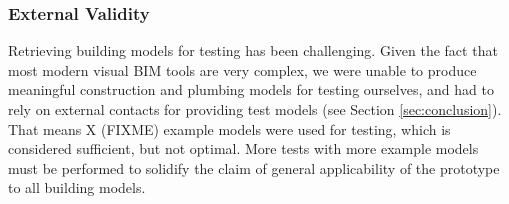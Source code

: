 \subsubsection{External Validity} Retrieving building models for testing has been challenging. Given the fact that most modern visual BIM tools are very complex, we were unable to produce meaningful construction and plumbing models for testing ourselves, and had to rely on external contacts for providing test models (see Section \ref{sec:conclusion}). That means X (FIXME) example models were used for testing, which is considered sufficient, but not optimal. More tests with more example models must be performed to solidify the claim of general applicability of the prototype to all building models.








